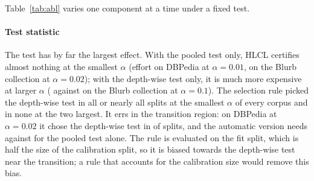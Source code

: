 \documentclass[preprint,12pt]{elsarticle}
\theoremstyle{definition}
\theoremstyle{remark}
\newcommand{\hlcl}{\textup{\textsc{HLCL}}}
\begin{document}
Table~\ref{tab:abl} varies one component at a time under a fixed test.

\paragraph{Test statistic}
The test has by far the largest effect. With the pooled test only, \hlcl{}
certifies almost nothing at the smallest $\alpha$ (effort
 on DBPedia at $\alpha=0.01$,
 on the Blurb collection at $\alpha=0.02$);
with the depth-wise test only, it is much more expensive at larger $\alpha$
( against  on
the Blurb collection at $\alpha=0.1$). The selection rule picked the depth-wise
test in all or nearly all splits at the smallest $\alpha$ of every corpus and in
none at the two largest. It errs in the transition region: on DBPedia at
$\alpha=0.02$ it chose the depth-wise test in 
of splits, and the automatic version needs
 against 
for the pooled test alone. The rule is evaluated on the fit split, which is half
the size of the calibration split, so it is biased towards the depth-wise test
near the transition; a rule that accounts for the calibration size would remove
this bias.
\end{document}
